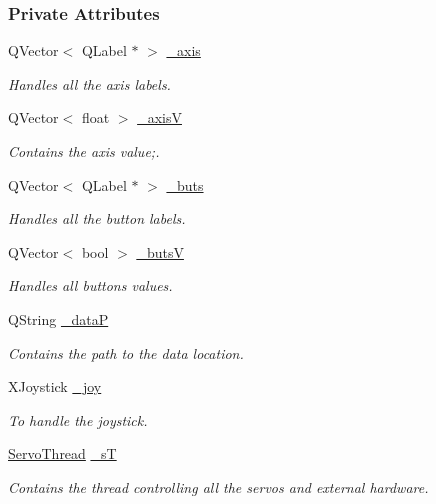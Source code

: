 \subsubsection*{Private Attributes}
\begin{DoxyCompactItemize}
\item 
Q\+Vector$<$ Q\+Label $\ast$ $>$ \hyperlink{a00005_a30c99d7a544f74b0650758e5cc7ead5a}{\+\_\+axis}
\begin{DoxyCompactList}\small\item\em Handles all the axis labels. \end{DoxyCompactList}\item 
Q\+Vector$<$ float $>$ \hyperlink{a00005_a20f66f574ed4c96d8dfc0013e1095f15}{\+\_\+axis\+V}
\begin{DoxyCompactList}\small\item\em Contains the axis value;. \end{DoxyCompactList}\item 
Q\+Vector$<$ Q\+Label $\ast$ $>$ \hyperlink{a00005_a8eaf474e1b8672f32873ed009e28ce8a}{\+\_\+buts}
\begin{DoxyCompactList}\small\item\em Handles all the button labels. \end{DoxyCompactList}\item 
Q\+Vector$<$ bool $>$ \hyperlink{a00005_a519ae4630572cb63fbd04bce12fe8e77}{\+\_\+buts\+V}
\begin{DoxyCompactList}\small\item\em Handles all buttons values. \end{DoxyCompactList}\item 
Q\+String \hyperlink{a00005_aaccbe653019df03668429890e325ac21}{\+\_\+data\+P}
\begin{DoxyCompactList}\small\item\em Contains the path to the data location. \end{DoxyCompactList}\item 
X\+Joystick \hyperlink{a00005_a671f35800890e518713e1946671d8730}{\+\_\+joy}
\begin{DoxyCompactList}\small\item\em To handle the joystick. \end{DoxyCompactList}\item 
\hyperlink{a00009}{Servo\+Thread} \hyperlink{a00005_a97f8ecc7ecb930b796178cef7b975013}{\+\_\+s\+T}
\begin{DoxyCompactList}\small\item\em Contains the thread controlling all the servos and external hardware. \end{DoxyCompactList}\item 

\end{DoxyCompactItemize}
